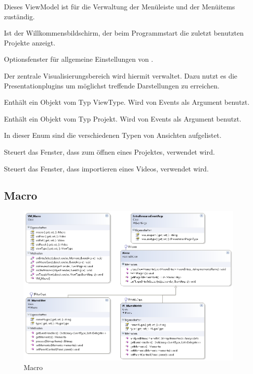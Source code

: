 Dieses ViewModel ist für die Verwaltung der Menüleiste und der Menüitems zuständig.


Ist der Willkommensbildschirm, der beim Programmstart die zuletzt benutzten Projekte anzeigt.


Optionsfenster für allgemeine Einstellungen von \projektTitel.


Der zentrale Visualisierungsbereich wird hiermit verwaltet. Dazu nutzt es die Presentationplugins um möglichst treffende Darstellungen zu erreichen.


Enthält ein Objekt vom Typ ViewType. Wird von Events als Argument benutzt.


Enthält ein Objekt vom Typ Projekt. Wird von Events als Argument benutzt.


In dieser Enum sind die verschiedenen Typen von Ansichten aufgelistet.

Steuert das Fenster, dass zum öffnen eines Projektes, verwendet wird.


Steuert das Fenster, dass importieren eines Videos, verwendet wird.

\pagebreak
\subsection{Macro}
\begin{figure}[H]
\noindent\includegraphics[width=\linewidth,height=\textheight,
keepaspectratio]{bilder/Klassendiagramm/Macro.png}
\caption{Macro}
\end{figure}


